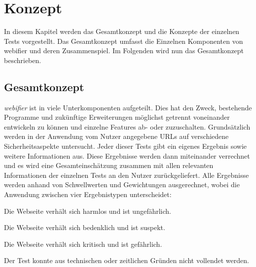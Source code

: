 \chapter{Konzept}

In diesem Kapitel werden das Gesamtkonzept und die Konzepte der einzelnen Tests vorgestellt. Das Gesamtkonzept umfasst die Einzelnen Komponenten von webifier und deren Zusammenspiel. Im Folgenden wird nun das Gesamtkonzept beschrieben.

\section{Gesamtkonzept}

\textit{webifier} ist in viele Unterkomponenten aufgeteilt.
Dies hat den Zweck, bestehende Programme und zukünftige Erweiterungen möglichst getrennt voneinander entwickeln zu können und einzelne Features ab- oder zuzuschalten.
Grundsätzlich werden in der Anwendung vom Nutzer angegebene URLs auf verschiedene Sicherheitsaspekte untersucht.
Jeder dieser Tests gibt ein eigenes Ergebnis sowie weitere Informationen aus.
Diese Ergebnisse werden dann miteinander verrechnet und es wird eine Gesamteinschätzung zusammen mit allen relevanten Informationen der einzelnen Tests an den Nutzer zurückgeliefert.
Alle Ergebnisse werden anhand von Schwellwerten und Gewichtungen ausgerechnet, wobei die Anwendung zwischen vier Ergebnistypen unterscheidet:
\begin{description}
	\centering
    \item[unbedenklich (\texttt{CLEAN})] Die Webseite verhält sich harmlos und ist ungefährlich.
    \item[verdächtig (\texttt{SUSPICIOUS})] Die Webseite verhält sich bedenklich und ist suspekt.
    \item[bedrohlich (\texttt{MALICIOUS})] Die Webseite verhält sich kritisch und ist gefährlich.
	\item[unbekannt (\texttt{UNDEFINED})] Der Test konnte aus technischen oder zeitlichen Gründen nicht vollendet werden.
\end{description}

